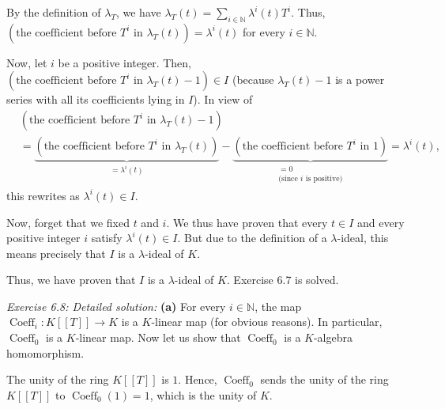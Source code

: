 \documentclass[numbers=enddot,12pt,final,onecolumn,notitlepage]{scrartcl}%
\begin{document}
By the definition of $\lambda_{T}$, we have $\lambda_{T}\left(  t\right)
=\sum\limits_{i\in\mathbb{N}}\lambda^{i}\left(  t\right)  T^{i}$. Thus,
$\left(  \text{the coefficient before }T^{i}\text{ in }\lambda_{T}\left(
t\right)  \right)  =\lambda^{i}\left(  t\right)  $ for every $i\in\mathbb{N}$.

Now, let $i$ be a positive integer. Then, $\left(  \text{the coefficient
before }T^{i}\text{ in }\lambda_{T}\left(  t\right)  -1\right)  \in I$
(because $\lambda_{T}\left(  t\right)  -1$ is a power series with all its
coefficients lying in $I$). In view of%
\begin{align*}
&  \left(  \text{the coefficient before }T^{i}\text{ in }\lambda_{T}\left(
t\right)  -1\right) \\
&  =\underbrace{\left(  \text{the coefficient before }T^{i}\text{ in }%
\lambda_{T}\left(  t\right)  \right)  }_{=\lambda^{i}\left(  t\right)
}-\underbrace{\left(  \text{the coefficient before }T^{i}\text{ in }1\right)
}_{\substack{=0\\\text{(since }i\text{ is positive)}}}=\lambda^{i}\left(
t\right)  ,
\end{align*}
this rewrites as $\lambda^{i}\left(  t\right)  \in I$.

Now, forget that we fixed $t$ and $i$. We thus have proven that every $t\in I$
and every positive integer $i$ satisfy $\lambda^{i}\left(  t\right)  \in I$.
But due to the definition of a $\lambda$-ideal, this means precisely that $I$
is a $\lambda$-ideal of $K$.

Thus, we have proven that $I$ is a $\lambda$-ideal of $K$. Exercise 6.7 is solved.

\textit{Exercise 6.8: Detailed solution:} \textbf{(a)} For every
$i\in\mathbb{N}$, the map $\operatorname*{Coeff}\nolimits_{i}:K\left[  \left[
T\right]  \right]  \rightarrow K$ is a $K$-linear map (for obvious reasons).
In particular, $\operatorname*{Coeff}\nolimits_{0}$ is a $K$-linear map. Now
let us show that $\operatorname*{Coeff}\nolimits_{0}$ is a $K$-algebra homomorphism.

The unity of the ring $K\left[  \left[  T\right]  \right]  $ is $1$. Hence,
$\operatorname*{Coeff}\nolimits_{0}$ sends the unity of the ring $K\left[
\left[  T\right]  \right]  $ to $\operatorname*{Coeff}\nolimits_{0}\left(
1\right)  =1$, which is the unity of $K$.
\end{document}

